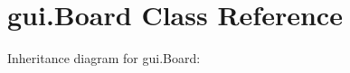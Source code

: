 \hypertarget{classgui_1_1Board}{}\section{gui.\+Board Class Reference}
\label{classgui_1_1Board}


Inheritance diagram for gui.\+Board\+:
